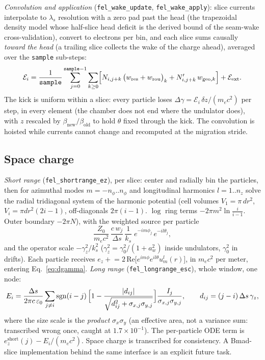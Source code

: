 \documentclass[11pt]{article}
\newcommand{\code}[1]{\texttt{#1}}
\begin{document}
\emph{Convolution and application} (\code{fel\_wake\_update}, \code{fel\_wake\_apply}):
slice currents interpolate to $\lambda_s$ resolution with a zero pad past the head
(the trapezoidal density model whose half-slice head deficit is the derived bound of
the seam-wake cross-validation), convert to electrons per bin, and each slice sums
causally \emph{toward the head} (a trailing slice collects the wake of the charge
ahead), averaged over the \code{sample} sub-steps:
\begin{equation}\label{eq:eloss}
  \mathcal{E}_i = \frac{1}{\code{sample}}\sum_{j=0}^{\code{sample}-1}
    \sum_{k\ge0} \Bigl[N_{i,j+k}\,\bigl(w_{\mathrm{res}}+w_{\mathrm{rou}}\bigr)_k
     + N'_{i,j+k}\, w_{\mathrm{geo},k}\Bigr] + \mathcal{E}_{\mathrm{ext}} .
\end{equation}
The kick is uniform within a slice: every particle loses $\Delta\gamma =
\mathcal{E}_i\,\delta z/(m_e c^2)$ per step, in every element (the chamber does not
end where the undulator does), with $z$ rescaled by $\beta_{\mathrm{new}}/
\beta_{\mathrm{old}}$ to hold $\theta$ fixed through the kick. The convolution is
hoisted while currents cannot change and recomputed at the migration stride.

\subsection{Space charge}\label{sec:spacecharge}

\emph{Short range} (\code{fel\_shortrange\_ez}), per slice: center and radially bin the
particles, then for azimuthal modes $m = -n_\phi..n_\phi$ and longitudinal harmonics
$l = 1..n_z$ solve the radial tridiagonal system of the harmonic potential
(cell volumes $V_1 = \pi\,dr^2$, $V_i = \pi dr^2(2i-1)$, off-diagonals
$2\pi(i-1)$. $\log$ ring terms $-2\pi m^2\ln\frac{i}{i-1}$. Outer boundary
$-2\pi N$), with the weighted source per particle
\begin{equation}\label{eq:scsource}
  \frac{Z_0}{m_ec^2}\,\frac{c\, w_j}{\Delta s}\,\frac{1}{k_s}\;
  e^{-im\phi_j}\, e^{-il\theta_j},
\end{equation}
and the operator scale $-\gamma_z^2/k_s^2$ ($\gamma_z^2 = \gamma_0^2/(1+a_w^2)$ inside
undulators, $\gamma_0^2$ in drifts). Each particle receives
$e_z \mathrel{+}= 2\,\mathrm{Re}\bigl[e^{im\phi}e^{il\theta} u_m^l(r)\bigr]$, in
$m_ec^2$ per meter, entering Eq.~\ref{eq:dgamma}. \emph{Long range}
(\code{fel\_longrange\_esc}), whole window, one node:
\begin{equation}\label{eq:longrange}
  E_i = \frac{\Delta s}{2\pi c\,\varepsilon_0}\sum_{j\ne i}
    \mathrm{sgn}(i-j)\,
    \Bigl[1 - \frac{|d_{ij}|}{\sqrt{d_{ij}^2 + \sigma_{x,j}\sigma_{y,j}}}\Bigr]
    \frac{I_j}{\sigma_{x,j}\sigma_{y,j}}, \qquad d_{ij} = (j-i)\,\Delta s\,\gamma_z,
\end{equation}
where the size scale is the \emph{product} $\sigma_x\sigma_y$ (an effective area, not
a variance sum: transcribed wrong once, caught at $1.7\times10^{-1}$). The
per-particle ODE term is $e_z^{\mathrm{short}}(j) - E_i/(m_ec^2)$. Space charge is
transcribed for consistency. A Bmad-slice implementation behind the same interface is
an explicit future task.
\end{document}
